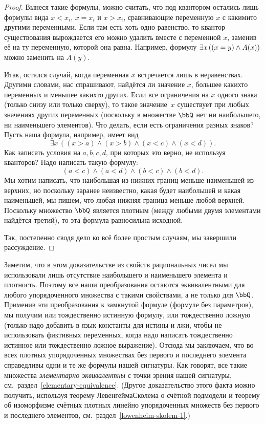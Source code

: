 \begin{proof}
Вынеся такие формулы, можно считать, что под квантором остались
лишь формулы вида $x<x_i$, $x=x_i$ и $x>x_i$, сравнивающие
переменную $x$ с какими\д то другими переменными. Если там
есть хоть одно равенство, то квантор существования вырождается\т
его можно удалить вместе с переменной $x$, заменив её на ту
переменную, которой она равна. Например, формулу $\exists
x\,((x\hm=y)\hm\land A(x))$ можно заменить на $A(y)$.

Итак, остался случай, когда переменная $x$ встречается лишь в
неравенствах. Другими словами, нас спрашивают, найдётся ли
значение $x$, большее каких\д то переменных и меньшее
каких\д то других. Если все ограничения на $x$ одного знака
(только снизу или только сверху), то такое значение~$x$
существует при любых
значениях других переменных (поскольку в множестве $\bbQ$ нет
ни наибольшего, ни наименьшего элементов). Что делать, если
есть ограничения разных знаков? Пусть наша формула, например,
имеет вид
        $$
\exists x \, ((x>a)\land (x>b)\land(x<c)\land(x<d)).
        $$
Как записать условия на $a,b,c,d$, при которых это верно,
не используя кванторов? Надо написать такую формулу:
        $$
(a<c)\land (a<d)\land (b<c) \land (b<d).
        $$
Мы хотим написать, что наибольшая из нижних границ меньше
наименьшей из верхних, но поскольку заранее неизвестно, какая
будет наибольшей и какая наименьшей, мы пишем, что любая нижняя
граница меньше любой верхней. Поскольку множество $\bbQ$
является плотным (между любыми двумя элементами найдётся
третий), то эта формула равносильна исходной.

Так, постепенно сводя дело ко всё более простым случаям,
мы завершили рассуждение.
\end{proof}

Заметим, что в этом доказательстве из свойств рациональных чисел
мы использовали лишь отсутствие наибольшего и наименьшего
элемента и плотность. Поэтому все наши преобразования остаются
эквивалентными для любого упорядоченного множества с такими
свойствами, а не только для $\bbQ$. Применив эти преобразования
к замкнутой формуле (формуле без параметров), мы получим или
тождественно истинную формулу, или тождественно ложную (только
надо добавить в язык константы для истины и лжи, чтобы не
использовать фиктивных переменных, когда надо написать
тождественно истинное или тождественно ложное выражение). Отсюда
мы заключаем, что во всех плотных упорядоченных множествах без
первого и последнего элемента справедливы одни и те же формулы
нашей сигнатуры. Как говорят, все такие
        \label{dense-sets-elementary-equivalence}%
множества \emph{элементарно эквивалентны}%
%
с точки
зрения нашей сигнатуры, см.~раздел~\ref{elementary-equivalence}.
(Другое доказательство этого
факта можно получить, используя теорему Левенгейма\ч Сколема%
%
%
о счётной подмодели и теорему об изоморфизме счётных
плотных линейно упорядоченных множеств без первого и
последнего элементов, см.~раздел~\ref{lowenheim-skolem-1}.)

